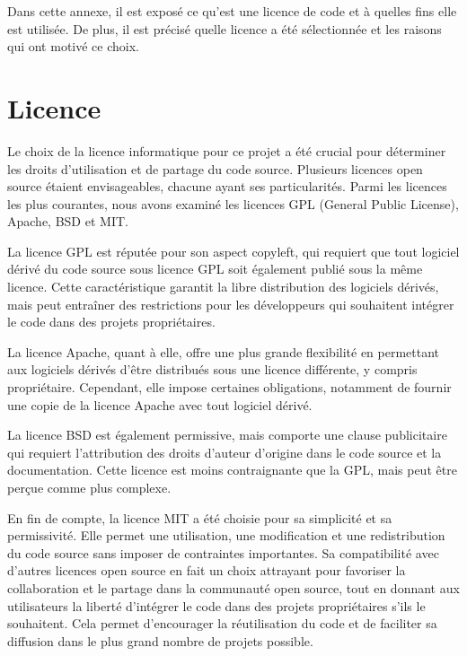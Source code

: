 Dans cette annexe, il est exposé ce qu'est une licence de code et à quelles fins elle est utilisée.
De plus, il est précisé quelle licence a été sélectionnée et les raisons qui ont motivé ce choix.

\section{Licence}

Le choix de la licence informatique pour ce projet a été crucial pour déterminer les droits d'utilisation et de partage du code source.
Plusieurs licences open source étaient envisageables, chacune ayant ses particularités.
Parmi les licences les plus courantes, nous avons examiné les licences GPL (General Public License), Apache, BSD et MIT.

La licence GPL est réputée pour son aspect copyleft, qui requiert que tout logiciel dérivé du code source sous licence GPL soit également publié sous la même licence.
Cette caractéristique garantit la libre distribution des logiciels dérivés, mais peut entraîner des restrictions pour les développeurs qui souhaitent intégrer le code dans des projets propriétaires.

La licence Apache, quant à elle, offre une plus grande flexibilité en permettant aux logiciels dérivés d'être distribués sous une licence différente, y compris propriétaire.
Cependant, elle impose certaines obligations, notamment de fournir une copie de la licence Apache avec tout logiciel dérivé.

La licence BSD est également permissive, mais comporte une clause publicitaire qui requiert l'attribution des droits d'auteur d'origine dans le code source et la documentation.
Cette licence est moins contraignante que la GPL, mais peut être perçue comme plus complexe.

En fin de compte, la licence MIT a été choisie pour sa simplicité et sa permissivité.
Elle permet une utilisation, une modification et une redistribution du code source sans imposer de contraintes importantes.
Sa compatibilité avec d'autres licences open source en fait un choix attrayant pour favoriser la collaboration et le partage dans la communauté open source, tout en donnant aux utilisateurs la liberté d'intégrer le code dans des projets propriétaires s'ils le souhaitent.
Cela permet d'encourager la réutilisation du code et de faciliter sa diffusion dans le plus grand nombre de projets possible.